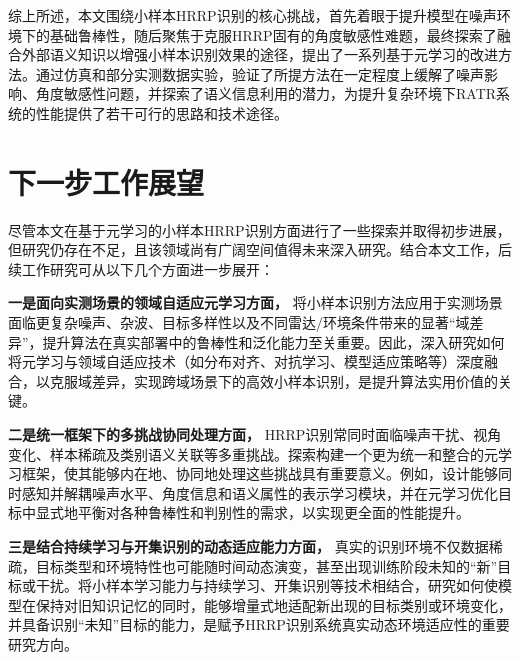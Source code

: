 综上所述，本文围绕小样本HRRP识别的核心挑战，首先着眼于提升模型在噪声环境下的基础鲁棒性，随后聚焦于克服HRRP固有的角度敏感性难题，最终探索了融合外部语义知识以增强小样本识别效果的途径，提出了一系列基于元学习的改进方法。通过仿真和部分实测数据实验，验证了所提方法在一定程度上缓解了噪声影响、角度敏感性问题，并探索了语义信息利用的潜力，为提升复杂环境下RATR系统的性能提供了若干可行的思路和技术途径。

\section{下一步工作展望}
\label{sec}

尽管本文在基于元学习的小样本HRRP识别方面进行了一些探索并取得初步进展，但研究仍存在不足，且该领域尚有广阔空间值得未来深入研究。结合本文工作，后续工作研究可从以下几个方面进一步展开：

\textbf{一是面向实测场景的领域自适应元学习方面，} 将小样本识别方法应用于实测场景面临更复杂噪声、杂波、目标多样性以及不同雷达/环境条件带来的显著“域差异”，提升算法在真实部署中的鲁棒性和泛化能力至关重要。因此，深入研究如何将元学习与领域自适应技术（如分布对齐、对抗学习、模型适应策略等）深度融合，以克服域差异，实现跨域场景下的高效小样本识别，是提升算法实用价值的关键。

\textbf{二是统一框架下的多挑战协同处理方面，} HRRP识别常同时面临噪声干扰、视角变化、样本稀疏及类别语义关联等多重挑战。探索构建一个更为统一和整合的元学习框架，使其能够内在地、协同地处理这些挑战具有重要意义。例如，设计能够同时感知并解耦噪声水平、角度信息和语义属性的表示学习模块，并在元学习优化目标中显式地平衡对各种鲁棒性和判别性的需求，以实现更全面的性能提升。

\textbf{三是结合持续学习与开集识别的动态适应能力方面， }真实的识别环境不仅数据稀疏，目标类型和环境特性也可能随时间动态演变，甚至出现训练阶段未知的“新”目标或干扰。将小样本学习能力与持续学习、开集识别等技术相结合，研究如何使模型在保持对旧知识记忆的同时，能够增量式地适配新出现的目标类别或环境变化，并具备识别“未知”目标的能力，是赋予HRRP识别系统真实动态环境适应性的重要研究方向。